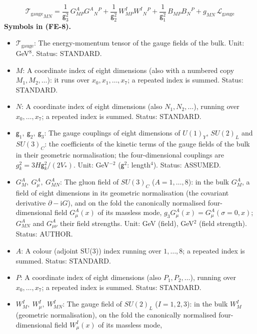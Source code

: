 \documentclass[
  10pt,
]{article}
\providecommand{\tightlist}{%
  \setlength{\itemsep}{0pt}\setlength{\parskip}{0pt}}
\begin{document}
\[
{\mathcal{T}_{\mathrm{gauge}}}_{MN} = \frac{1}{\mathsf{g}_3^2}\,G^A_{MP}G^A{}_N{}^P + \frac{1}{\mathsf{g}_2^2}\,W^I_{MP}W^I{}_N{}^P
 + \frac{1}{\mathsf{g}_1^2}\,B_{MP}B_N{}^P + g_{MN}\,\mathcal{L}_{\mathrm{gauge}} \tag{FE-8}
\] \textbf{Symbols in (FE-8).}

\begin{itemize}
\tightlist
\item
  \(\mathcal{T}_{\mathrm{gauge}}\): The energy-momentum tensor of the
  gauge fields of the bulk. Unit: GeV\(^8\). Status: STANDARD.
\item
  \(M\): A coordinate index of eight dimensions (also with a numbered
  copy \(M_1, M_2, \dots\)): it runs over \(x_0, x_1, \dots, x_7\); a
  repeated index is summed. Status: STANDARD.
\item
  \(N\): A coordinate index of eight dimensions (also
  \(N_1, N_2, \dots\)), running over \(x_0, \dots, x_7\); a repeated
  index is summed. Status: STANDARD.
\item
  \(\mathsf{g}_1,\ \mathsf{g}_2,\ \mathsf{g}_3\): The gauge couplings of
  eight dimensions of \(U(1)_Y\), \(SU(2)_L\) and \(SU(3)_C\): the
  coefficients of the kinetic terms of the gauge fields of the bulk in
  their geometric normalisation; the four-dimensional couplings are
  \(g_k^2 = 3H\mathsf{g}_k^2/(2V_*)\). Unit: GeV\(^{-2}\)
  (\(\mathsf{g}^2\): length\(^4\)). Status: ASSUMED.
\item
  \(G^A_M,\ G^A_\mu,\ G^A_{MN}\): The gluon field of \(SU(3)_C\)
  (\(A = 1, \dots, 8\)): in the bulk \(G^A_M\), a field of eight
  dimensions in its geometric normalisation (the covariant derivative
  \(\partial - \mathrm{i}G\)), and on the fold the canonically
  normalised four-dimensional field \(G^A_\mu(x)\) of its massless mode,
  \(g_3G^A_\mu(x) = G^A_\mu(\sigma = 0, x)\); \(G^A_{MN}\) and
  \(G^A_{\mu\nu}\) their field strengths. Unit: GeV (field), GeV\(^2\)
  (field strength). Status: AUTHOR.
\item
  \(A\): A colour (adjoint SU(3)) index running over \(1, \dots, 8\); a
  repeated index is summed. Status: STANDARD.
\item
  \(P\): A coordinate index of eight dimensions (also
  \(P_1, P_2, \dots\)), running over \(x_0, \dots, x_7\); a repeated
  index is summed. Status: STANDARD.
\item
  \(W^I_M,\ W^I_\mu,\ W^I_{MN}\): The gauge field of \(SU(2)_L\)
  (\(I = 1, 2, 3\)): in the bulk \(W^I_M\) (geometric normalisation), on
  the fold the canonically normalised four-dimensional field
  \(W^I_\mu(x)\) of its massless mode,

\end{itemize}
\end{document}
